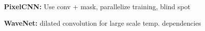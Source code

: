 \textbf{PixelCNN:} Use conv + mask, parallelize training, blind spot\\

\textbf{WaveNet:} dilated convolution for large scale temp. dependencies\\

